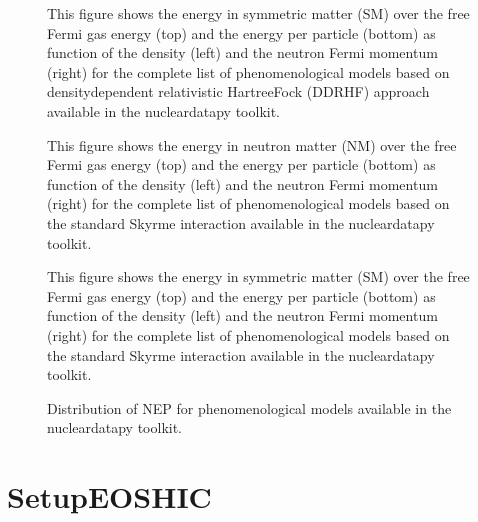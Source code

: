 \documentclass[letterpaper,10pt,english]{sphinxmanual}
\begin{document}
\begin{figure}[htbp]
\centering
\capstart

\noindent{}
\caption{This figure shows the energy in symmetric matter (SM) over the free Fermi gas energy (top) and the energy per particle (bottom) as function of the density (left) and the neutron Fermi momentum (right) for the complete list of phenomenological models based on density\sphinxhyphen{}dependent relativistic Hartree\sphinxhyphen{}Fock (DDRHF) approach available in the nucleardatapy toolkit.}\label{\detokenize{source/api/setup_pheno:id6}}\end{figure}

\begin{figure}[htbp]
\centering
\capstart

\noindent{}
\caption{This figure shows the energy in neutron matter (NM) over the free Fermi gas energy (top) and the energy per particle (bottom) as function of the density (left) and the neutron Fermi momentum (right) for the complete list of phenomenological models based on the standard Skyrme interaction available in the nucleardatapy toolkit.}\label{\detokenize{source/api/setup_pheno:id7}}\end{figure}

\begin{figure}[htbp]
\centering
\capstart

\noindent{}
\caption{This figure shows the energy in symmetric matter (SM) over the free Fermi gas energy (top) and the energy per particle (bottom) as function of the density (left) and the neutron Fermi momentum (right) for the complete list of phenomenological models based on the standard Skyrme interaction available in the nucleardatapy toolkit.}\label{\detokenize{source/api/setup_pheno:id8}}\end{figure}

\begin{figure}[htbp]
\centering
\capstart

\noindent{}
\caption{Distribution of NEP for phenomenological models available in the nucleardatapy toolkit.}\label{\detokenize{source/api/setup_pheno:id9}}\end{figure}

\sphinxstepscope


\section{SetupEOSHIC}
\label{\detokenize{source/api/setup_eoshic:setupeoshic}}\label{\detokenize{source/api/setup_eoshic::doc}}\label{\detokenize{source/api/setup_eoshic:module-nucleardatapy.setup_eoshic}}
\end{document}
